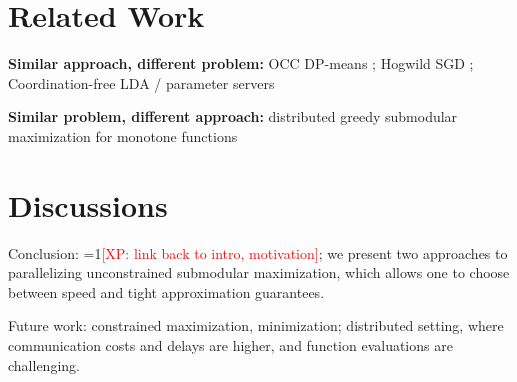 \documentclass{article} %
\newcommand{\Comments}{1}
\newcommand{\note}[2]{\ifnum\Comments=1\textcolor{#1}{#2}\fi}
\newcommand{\xinghao}[1]{\note{red}{[XP: #1]}}
\begin{document}
\section{Related Work \label{sec:related}}
\textbf{Similar approach, different problem: } OCC DP-means \cite{pan2013}; Hogwild SGD \cite{Recht11}; Coordination-free LDA \cite{Ahmed12} / parameter servers \cite{li2013, ho2013}

\textbf{Similar problem, different approach: } distributed greedy submodular maximization for monotone functions \cite{Mirzasoleiman2013}






\section{Discussions \label{sec:discussions}}

Conclusion: \xinghao{link back to intro, motivation}; we present two approaches to parallelizing unconstrained submodular maximization, which allows one to choose between speed and tight approximation guarantees.

Future work: constrained maximization, minimization; distributed setting, where communication costs and delays are higher, and function evaluations are challenging.


{\footnotesize




}

\newpage
\appendix
\end{document}
